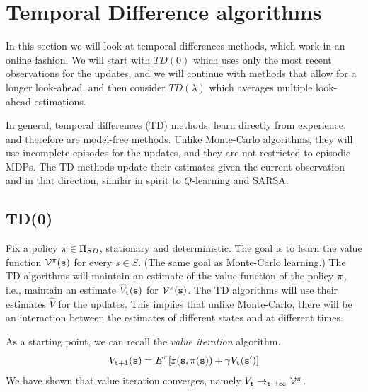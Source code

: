 \section{Temporal Difference algorithms}
\label{sec:TD}

In this section we will look at temporal differences methods, which
work in an online fashion. We will start with $TD(0)$ which uses
only the most recent observations for the updates, and we will
continue with methods that allow for a longer look-ahead, and then
consider $TD(\lambda)$ which averages multiple look-ahead
estimations.

In general, temporal differences (TD) methods, learn directly from
experience, and therefore are model-free methods. Unlike Monte-Carlo
algorithms, they will use incomplete episodes for the updates, and
they are not restricted to episodic MDPs. The TD methods update
their estimates given the current observation and in that direction,
similar in spirit to $Q$-learning and SARSA.

\subsection{TD(0)}

Fix a policy $\pi\in \Pi_{SD}$, stationary and deterministic. The goal
is to learn the value function $\mathcal{V}^\pi({\tt s})$ for every
$s\in S$. (The same goal as Monte-Carlo learning.) The TD algorithms
will maintain an estimate of the value function of the policy
$\pi$, i.e., maintain an estimate $\widehat{V}_{\tt t}({\tt s})$
for $\mathcal{V}^\pi({\tt s})$. The TD algorithms will use their
estimates $\widehat{V}$ for the updates. This implies that unlike
Monte-Carlo, there will be an interaction between the estimates of
different states and at different times.

As a starting point, we can recall the {\em value iteration}
algorithm.
\[
V_{{\tt t}+1}({\tt s})=E^\pi[{\tt r}({\tt s},\pi({\tt s}))+\gamma
V_{\tt t}({\tt s}')]
\]
We have shown that value iteration converges, namely $V_{\tt t}
\rightarrow_{{\tt t}\rightarrow\infty} \mathcal{V}^\pi$.


